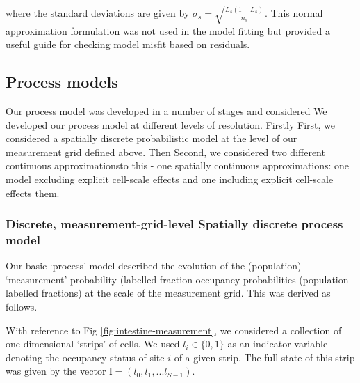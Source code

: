 \documentclass[10pt,letterpaper]{article}
\providecommand{\DIFaddtex}[1]{{\protect\color{blue} \sf #1}} %
\providecommand{\DIFdeltex}[1]{{\protect\color{red} \scriptsize #1}} %
\providecommand{\DIFaddbegin}{} %
\providecommand{\DIFaddend}{} %
\providecommand{\DIFdelbegin}{} %
\providecommand{\DIFdelend}{} %
\providecommand{\DIFadd}[1]{\texorpdfstring{\DIFaddtex{#1}}{#1}} %
\providecommand{\DIFdel}[1]{\texorpdfstring{\DIFdeltex{#1}}{}} %
\begin{document}
where the standard deviations are given by
\(\sigma_s = \sqrt{\frac{L_s(1-L_s)}{n_s}}\).
\DIFdelbegin \DIFdel{This normal approximation
formulation was not used in the model fitting but provided a useful
guide for checking model misfit based on residuals.
}\DIFdelend 

\subsection{Process models}\label{process-models}

\DIFdelbegin \DIFdel{Our process model was developed in a number of stages and considered }\DIFdelend \DIFaddbegin \DIFadd{We developed our process model }\DIFaddend at different levels of resolution. \DIFdelbegin \DIFdel{Firstly}\DIFdelend \DIFaddbegin \DIFadd{First}\DIFaddend ,
we considered a \DIFaddbegin \DIFadd{spatially }\DIFaddend discrete probabilistic model at the level of
our measurement grid defined above. \DIFdelbegin \DIFdel{Then }\DIFdelend \DIFaddbegin \DIFadd{Second, }\DIFaddend we considered two \DIFdelbegin \DIFdel{different continuous approximationsto this - one }\DIFdelend \DIFaddbegin \DIFadd{spatially
continuous approximations: one model }\DIFaddend excluding explicit cell-scale
effects and one including \DIFdelbegin \DIFdel{explicit
cell-scale effects}\DIFdelend \DIFaddbegin \DIFadd{them}\DIFaddend .

\subsubsection{\DIFdelbegin \DIFdel{Discrete, measurement-grid-level }\DIFdelend \DIFaddbegin \DIFadd{Spatially discrete }\DIFaddend process
model}\DIFdelbegin %
\DIFdelend \DIFaddbegin \label{spatially-discrete-process-model}
\DIFaddend 

Our basic `process' model described the evolution of the \DIFdelbegin \DIFdel{(population)
`measurement' probability (labelled fraction}\DIFdelend \DIFaddbegin \DIFadd{occupancy
probabilities (population labelled fractions}\DIFaddend ) at the scale of the
measurement grid. This was derived as follows. \DIFdelbegin %

\DIFdelend With reference to Fig
\ref{fig:intestine-measurement}, we considered a collection of
one-dimensional `strips' of cells. We used \(l_i \in \{0,1\}\) as an
indicator variable denoting the occupancy status of site \(i\) of a
given strip. The full state of this strip was given by the vector
\(\mathbf{l} = (l_0,l_1,...l_{S-1})\). \DIFdelbegin %
\end{document}
